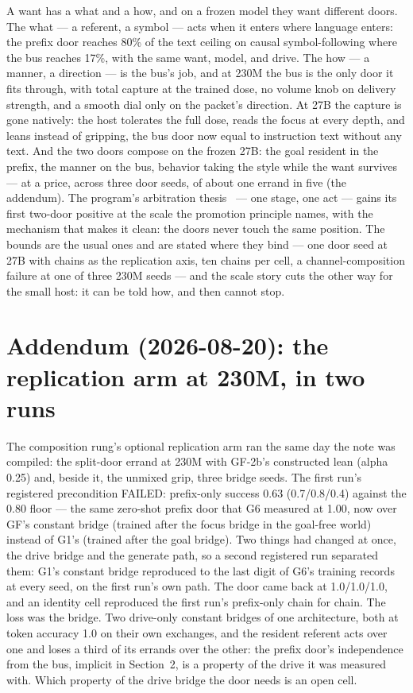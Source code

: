 \documentclass[11pt]{article}
\begin{document}
A want has a what and a how, and on a frozen model they want different
doors. The what --- a referent, a symbol --- acts when it enters where
language enters: the prefix door reaches 80\%
of the text ceiling on causal symbol-following where the bus reaches
17\%, with the same want, model, and
drive. The how --- a manner, a direction --- is the bus's job, and at
230M the bus is the only door it fits through, with total capture at
the trained dose, no volume knob on delivery strength, and a smooth
dial only on the packet's direction. At 27B the capture is gone
natively: the host tolerates the full dose, reads the focus at every
depth, and leans instead of gripping, the bus door now equal to
instruction text without any text. And the two doors compose on the
frozen 27B: the goal resident in the prefix, the manner on the bus,
behavior taking the style while the want survives --- at a price,
across three door seeds, of about one errand in five (the addendum). The program's
arbitration thesis~\cite{penov2026onestage} --- one stage, one act
--- gains its first two-door positive at the scale the promotion
principle names, with the mechanism that makes it clean: the doors
never touch the same position. The bounds are the usual ones and are
stated where they bind --- one door seed at 27B with chains as the
replication axis, ten chains per cell, a channel-composition failure
at one of three 230M seeds --- and the scale story cuts the other way
for the small host: it can be told how, and then cannot stop.

\section*{Addendum (2026-08-20): the replication arm at 230M, in two runs}

The composition rung's optional replication arm ran the same day the
note was compiled: the split-door errand at 230M with GF-2b's
constructed lean (alpha 0.25) and, beside it, the unmixed grip, three
bridge seeds. The first run's registered precondition FAILED:
prefix-only success 0.63 (0.7/0.8/0.4)
against the 0.80 floor --- the same zero-shot prefix door that G6
measured at 1.00, now over GF's constant bridge (trained after the
focus bridge in the goal-free world) instead of G1's (trained after
the goal bridge). Two things had changed at once, the drive bridge and
the generate path, so a second registered run separated them: G1's
constant bridge reproduced to the last digit of G6's training records
at every seed, on the first run's own path. The door came back at
1.0/1.0/1.0, and an
identity cell reproduced the first run's prefix-only chain for chain.
The loss was the bridge. Two drive-only constant bridges of one
architecture, both at token accuracy 1.0 on their own exchanges, and
the resident referent acts over one and loses a third of its errands
over the other: the prefix door's independence from the bus, implicit
in Section~2, is a property of the drive it was measured with. Which
property of the drive bridge the door needs is an open cell.
\end{document}
